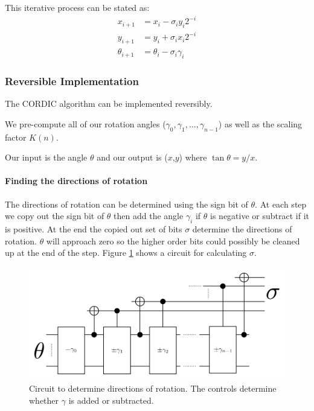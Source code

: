         This iterative process can be stated as:
        \begin{equation}\label{eq:cordIter}
            \begin{aligned}
                x_{i+1}      &= x_i - \sigma_iy_i2^{-i}\\
                y_{i+1}      &= y_i + \sigma_ix_i2^{-i}\\
                \theta_{i+1} &= \theta_i - \sigma_i\gamma_i
            \end{aligned}
        \end{equation}

    \subsubsection{Reversible Implementation}
        The CORDIC algorithm can be implemented reversibly.

        We pre-compute all of our rotation angles ($\gamma_0,\gamma_1,\dotsc,\gamma_{n-1}$) as well as the scaling factor $K(n)$.

        Our input is the angle $\theta$ and our output is ($x$,$y$) where $\tan\theta = y/x$.

        \paragraph{Finding the directions of rotation}
            The directions of rotation can be determined using the sign bit of $\theta$.
            At each step we copy out the sign bit of $\theta$ then add the angle $\gamma_i$ if $\theta$ is negative or subtract if it is positive.
            At the end the copied out set of bits $\sigma$ determine the directions of rotation.
            $\theta$ will approach zero so the higher order bits could possibly be cleaned up at the end of the step.
            Figure \ref{fig:CORDICDirections} shows a circuit for calculating $\sigma$.
            \begin{figure}[p]
                \capstart
                \centering
                \includegraphics[width=\textwidth]{images/CORDICDirections}
                \caption{Circuit to determine directions of rotation.  The controls determine whether $\gamma$ is added or subtracted.}
                \label{fig:CORDICDirections}
            \end{figure}

